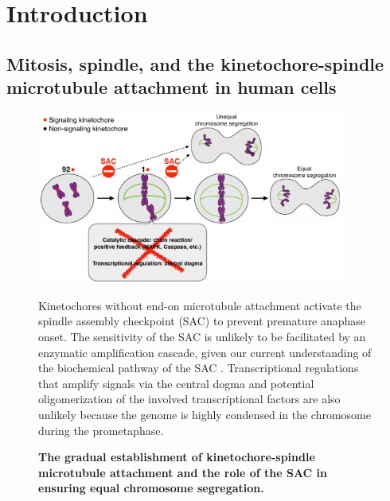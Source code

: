 \chapter{Introduction}
\label{chpt:introduction}



\section{Mitosis, spindle, and the kinetochore-spindle microtubule attachment in human cells}

\begin{figure}
    \centering
    \includegraphics[width=0.9\textwidth]{chapters/figures/SACRole.pdf}
    \caption{\textbf{The gradual establishment of kinetochore-spindle microtubule attachment and the role of the SAC in ensuring equal chromosome segregation.}}
    \noindent\justifying Kinetochores without end-on microtubule attachment activate the spindle assembly checkpoint (SAC) to prevent premature anaphase onset. The sensitivity of the SAC is unlikely to be facilitated by an enzymatic amplification cascade, given our current understanding of the biochemical pathway of the SAC \cite{InhibitorUltrasensitivity, Caspase}. Transcriptional regulations that amplify signals via the central dogma and potential oligomerization of the involved transcriptional factors \cite{TFMultimerization} are also unlikely because the genome is highly condensed in the chromosome during the prometaphase.
    \label{SACRole}
\end{figure}

